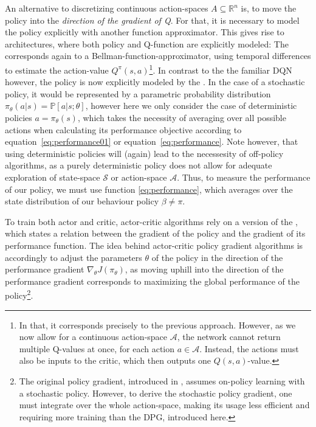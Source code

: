 \noindent An alternative to discretizing continuous action-spaces \mbox{$A \subseteq \mathds{R}^n$} is, to move the policy into the \textit{direction of the gradient of Q}. For that, it is necessary to model the policy explicitly with another function approximator. This gives rise to  architectures, where both policy and Q-function are explicitly modeled: The  corresponds again to a Bellman-function-approximator, using temporal differences to estimate the action-value $Q^\pi(s,a)$\footnote{In that, it corresponds precisely to the previous approach. However, as we now allow for a continuous action-space $\mathcal{A}$, the network cannot return multiple Q-values at once, for each action $a \in \mathcal{A}$. Instead, the actions must also be inputs to the critic, which then outputs one $Q(s,a)$-value.}. In contrast to the the familiar DQN however, the policy is now explicitly modeled by the . In the case of a stochastic policy, it would be represented by a parametric probability distribution $\pi_\theta(a|s) = \mathds{P}[a|s;\theta]$, however here we only consider the case of deterministic policies $a = \pi_\theta(s)$, which takes the necessity of averaging over all possible actions when calculating its performance objective according to equation~\ref{eq:performance01} or equation~\ref{eq:performance}. Note however, that using deterministic policies will (again) lead to the necessesity of off-policy algorithms, as a purely deterministic policy does not allow for adequate exploration of state-space $\mathcal{S}$ or action-space $\mathcal{A}$. Thus, to measure the performance of our policy, we must use function \ref{eq:performance}, which averages over the state distribution of our behaviour policy $\beta \neq \pi$. 

To train both actor and critic, actor-critic algorithms rely on a version of the , which states a relation between the gradient of the policy and the gradient of its performance function. The idea behind actor-critic policy gradient algorithms is accordingly to adjust the parameters $\theta$ of the policy in the direction of the performance gradient $\nabla_{\theta}J(\pi_\theta)$, as moving uphill into the direction of the performance gradient corresponds to maximizing the global performance of the policy\footnote{The original policy gradient, introduced in \cite{sutton_policy_2000}, assumes on-policy learning with a stochastic policy. However, to derive the stochastic policy gradient, one must integrate over the whole action-space, making its usage less efficient and requiring more training than the DPG, introduced here.}. 

